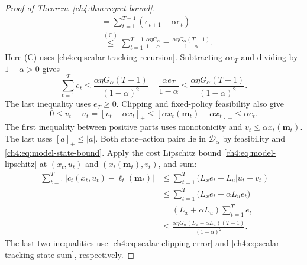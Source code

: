 \begin{proof}[Proof of Theorem~\ref{ch4:thm:regret-bound}]
\[\begin{aligned}
&=\sum_{t=1}^{T-1}(e_{t+1}-\alpha e_t)\\
&\overset{\mathrm{(C)}}{\le}
 \sum_{t=1}^{T-1}\frac{\alpha\eta G_\alpha}{1-\alpha}
 =\frac{\alpha\eta G_\alpha(T-1)}{1-\alpha}.
\end{aligned}
\]
Here (C) uses \eqref{ch4:eq:scalar-tracking-recursion}. Subtracting
$\alpha e_T$ and dividing by $1-\alpha>0$ gives
\begin{equation}
\label{ch4:eq:scalar-tracking-state-sum}
\sum_{t=1}^T e_t
\le\frac{\alpha\eta G_\alpha(T-1)}{(1-\alpha)^2}
   -\frac{\alpha e_T}{1-\alpha}
\le\frac{\alpha\eta G_\alpha(T-1)}{(1-\alpha)^2}.
\end{equation}
The last inequality uses $e_T\ge0$.
Clipping and fixed-policy feasibility also give
\begin{equation}
\label{ch4:eq:scalar-clipping-error}
0\le v_t-u_t=[v_t-\alpha x_t]_+
\le[\alpha x_t(\mathbf m_t)-\alpha x_t]_+
\le\alpha e_t.
\end{equation}
The first inequality between positive parts uses monotonicity and
$v_t\le\alpha x_t(\mathbf m_t)$. The last uses $[a]_+\le|a|$.
Both state--action pairs lie in $\mathcal D_\alpha$ by feasibility and
\eqref{ch4:eq:model-state-bound}. Apply the cost Lipschitz bound
\eqref{ch4:eq:model-lipschitz} at $(x_t,u_t)$ and
$(x_t(\mathbf m_t),v_t)$, and sum:
\begin{equation}
\label{ch4:eq:scalar-tracking-cost-sum}
\begin{aligned}
\sum_{t=1}^T|c_t(x_t,u_t)-\ell_t(\mathbf m_t)|
&\le\sum_{t=1}^T\bigl(L_xe_t+L_u|u_t-v_t|\bigr)\\
&\le\sum_{t=1}^T\bigl(L_xe_t+\alpha L_ue_t\bigr)\\
&=(L_x+\alpha L_u)\sum_{t=1}^Te_t\\
&\le\frac{\alpha\eta G_\alpha(L_x+\alpha L_u)(T-1)}{(1-\alpha)^2}.
\end{aligned}
\end{equation}
The last two inequalities use \eqref{ch4:eq:scalar-clipping-error}
and \eqref{ch4:eq:scalar-tracking-state-sum}, respectively.


\end{proof}

